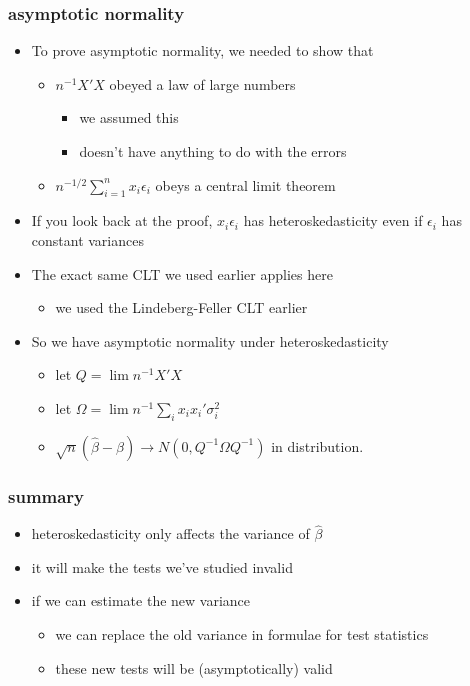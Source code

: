 \documentclass[11pt]{article}
\begin{document}
\subsubsection{asymptotic normality}
\label{sec-1-1-6}

\begin{itemize}
\item To prove asymptotic normality, we needed to show that
\begin{itemize}
\item $n^{-1} X'X$ obeyed a law of large numbers
\begin{itemize}
\item we assumed this
\item doesn't have anything to do with the errors
\end{itemize}
\item $n^{-1/2} \sum_{i=1}^n x_i \epsilon_i$ obeys a central limit
          theorem
\end{itemize}
\item If you look back at the proof, $x_i \epsilon_i$ has
        heteroskedasticity even if $\epsilon_i$ has constant variances
\item The exact same CLT we used earlier applies here
\begin{itemize}
\item we used the Lindeberg-Feller CLT earlier
\end{itemize}
\item So we have asymptotic normality under heteroskedasticity
\begin{itemize}
\item let $Q = \lim n^{-1} X'X$
\item let $\Omega = \lim n^{-1} \sum_i x_i x_i' \sigma_i^2$
\item $\sqrt{n}(\hat\beta - \beta) \to N(0, Q^{-1} \Omega Q^{-1})$ in
          distribution.
\end{itemize}
\end{itemize}
\subsubsection{summary}
\label{sec-1-1-7}

\begin{itemize}
\item heteroskedasticity only affects the variance of $\hat\beta$
\item it will make the tests we've studied invalid
\item if we can estimate the new variance
\begin{itemize}
\item we can replace the old variance in formulae for test statistics
\item these new tests will be (asymptotically) valid
\end{itemize}
\end{itemize}
\end{document}
